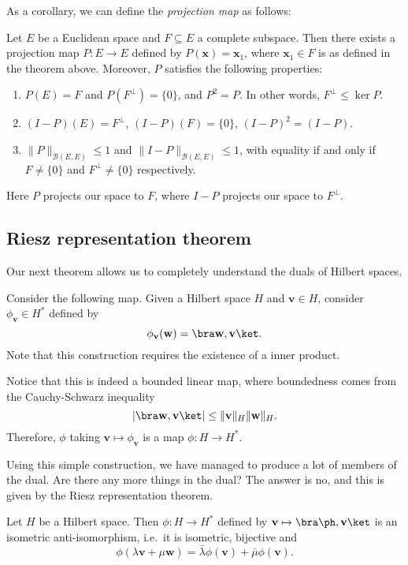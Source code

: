 \documentclass[a4paper]{article}
\begin{document}
As a corollary, we can define the \emph{projection map} as follows:
\begin{cor}
  Let $E$ be a Euclidean space and $F\subseteq E$ a complete subspace. Then there exists a projection map $P: E \to E$ defined by $P(\mathbf{x}) = \mathbf{x}_1$, where $\mathbf{x}_1 \in F$ is as defined in the theorem above. Moreover, $P$ satisfies the following properties:
  \begin{enumerate}
    \item $P(E) = F$ and $P(F^\perp) = \{0\}$, and $P^2 = P$. In other words, $F^\perp \leq \ker P$.
    \item $(I - P)(E) = F^{\perp}$, $(I - P)(F) = \{0\}$, $(I - P)^2 = (I - P)$.
    \item $\|P\|_{\mathcal{B}(E, E)} \leq 1$ and $\|I - P\|_{\mathcal{B}(E, E)} \leq 1$, with equality if and only if $F \not= \{0\}$ and $F^{\perp} \not= \{0\}$ respectively.
  \end{enumerate}
\end{cor}
Here $P$ projects our space to $F$, where $I - P$ projects our space to $F^\perp$.

\subsection{Riesz representation theorem}
Our next theorem allows us to completely understand the duals of Hilbert spaces.

Consider the following map. Given a Hilbert space $H$ and $\mathbf{v} \in H$, consider $\phi_{\mathbf{v}} \in H^*$ defined by
\[
  \phi_{\mathbf{v}}(\mathbf{w}) = \bra \mathbf{w}, \mathbf{v}\ket.
\]
Note that this construction requires the existence of a inner product.

Notice that this is indeed a bounded linear map, where boundedness comes from the Cauchy-Schwarz inequality
\[
  |\bra \mathbf{w}, \mathbf{v}\ket| \leq \|\mathbf{v}\|_H \|\mathbf{w}\|_H.
\]
Therefore, $\phi$ taking $\mathbf{v} \mapsto \phi_{\mathbf{v}}$ is a map $\phi: H \to H^*$.

Using this simple construction, we have managed to produce a lot of members of the dual. Are there any more things in the dual? The answer is no, and this is given by the Riesz representation theorem.
\begin{prop}
  Let $H$ be a Hilbert space. Then $\phi: H\to H^*$ defined by $\mathbf{v} \mapsto \bra \ph, \mathbf{v}\ket$ is an isometric anti-isomorphism, i.e.\ it is isometric, bijective and
  \[
    \phi(\lambda \mathbf{v} + \mu \mathbf{w}) = \bar{\lambda} \phi(\mathbf{v}) + \bar{\mu} \phi(\mathbf{v}).
  \]
\end{prop}
\end{document}
